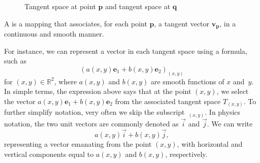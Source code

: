 \begin{figure}
	\begin{center}
	\end{center}
	\caption{Tangent space at point $\mathbf{p}$ and tangent space at $\mathbf{q}$}
	\label{fig:tangent_space}
\end{figure}

\begin{svgraybox}
	\begin{definition}
		A  is a mapping that associates, for each point $\mathbf{p}$, a tangent vector $\mathbf{v}_\mathbf{p}$, in a continuous and smooth manner. 
	\end{definition}
\end{svgraybox}
For instance, we can represent a vector in each tangent space using a formula, such as
\begin{equation}
(a(x,y) \mathbf{e}_1 + b(x,y)\mathbf{e}_2)_{(x,y)} 
\label{eq:smooth_vector_field}
\end{equation}
for $(x,y) \in \mathbb{R}^2$, where $a(x,y)$ and $b(x,y)$ are smooth functions of $x$ and~$y$. In simple terms, the expression above says that at the point $(x,y)$, we select the vector $a(x,y) \mathbf{e}_1 + b(x,y)\mathbf{e}_2$ from the associated tangent space $T_{(x,y)}$. To further simplify notation, very often we skip the subscript~${}_{(x,y)}$. In physics notation, the two unit vectors are commonly denoted as $\vec{i}$ and $\vec{j}$. We can write $$a(x,y) \vec{i} + b(x,y)\vec{j},$$  representing a vector emanating from the point $(x,y)$, with horizontal and vertical components equal to $a(x,y)$ and $b(x,y)$, respectively. 

